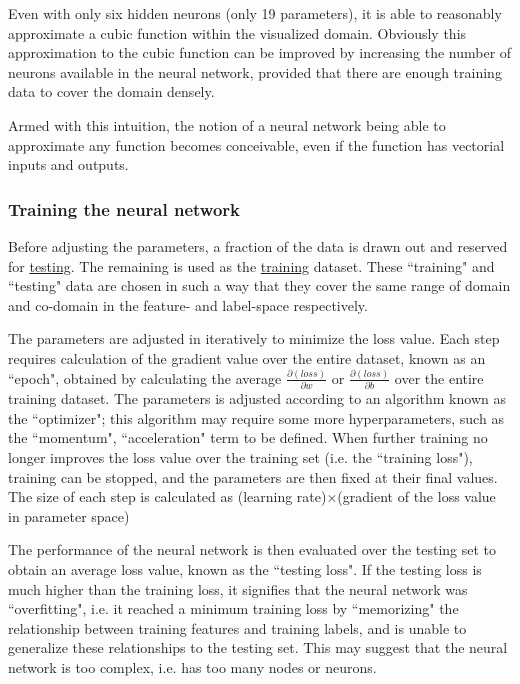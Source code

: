 \documentclass[a4paper, 12pt]{article}
\begin{document}
    Even with only six hidden neurons (only 19 parameters), it is able to reasonably approximate a cubic function within the visualized domain. Obviously this approximation to the cubic function can be improved by increasing the number of neurons available in the neural network, provided that there are enough training data to cover the domain densely.

    Armed with this intuition, the notion of a neural network being able to approximate any function becomes conceivable, even if the function has vectorial inputs and outputs. %

\subsubsection{Training the neural network}\label{sec:training}
    Before adjusting the parameters, a fraction of the data is drawn out and reserved for \underline{testing}. The remaining is used as the \underline{training} dataset. These ``training" and ``testing" data are chosen in such a way that they cover the same range of domain and co-domain in the feature- and label-space respectively.
    
    The parameters are adjusted in iteratively to minimize the loss value. Each step requires calculation of the gradient value over the entire dataset, known as an ``epoch", obtained by calculating the average $\frac{\partial (loss)}{\partial w}$ or $\frac{\partial (loss)}{\partial b}$ over the entire training dataset. The parameters is adjusted according to an algorithm known as the ``optimizer"; this algorithm may require some more hyperparameters, such as the ``momentum", ``acceleration" term to be defined. When further training no longer improves the loss value over the training set (i.e. the ``training loss"), training can be stopped, and the parameters are then fixed at their final values. The size of each step is calculated as (learning rate)$\times$(gradient of the loss value in parameter space)

    The performance of the neural network is then evaluated over the testing set to obtain an average loss value, known as the ``testing loss". If the testing loss is much higher than the training loss, it signifies that the neural network was ``overfitting", i.e. it reached a minimum training loss by ``memorizing" the relationship between training features and training labels, and is unable to generalize these relationships to the testing set. This may suggest that the neural network is too complex, i.e. has too many nodes or neurons.
\end{document}
